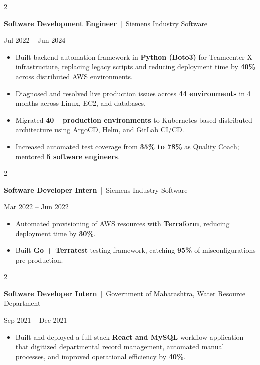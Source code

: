 \documentclass[10pt, letterpaper]{article}
\newenvironment{highlights}{
    \begin{itemize}[
        topsep=0.10 cm,
        parsep=0.06 cm,
        partopsep=0pt,
        itemsep=0.06 cm,
        leftmargin=12pt
    ]
}{
    \end{itemize}
}
\newenvironment{twocolentry}[2][]{
    \onecolentry
    \def\secondColumn{#2}
    \setcolumnwidth{\fill, 4.5 cm}
    \begin{paracol}{2}
}{
    \switchcolumn \raggedleft \secondColumn
    \end{paracol}
    \endonecolentry
}
\begin{document}
\vspace{0.15 cm}

\begin{twocolentry}{Jul 2022 -- Jun 2024}
\textbf{Software Development Engineer} \,|\, Siemens Industry Software
\end{twocolentry}
\begin{highlights}
  \item Built backend automation framework in \textbf{Python (Boto3)} for Teamcenter X infrastructure, replacing legacy scripts and reducing deployment time by \textbf{40\%} across distributed AWS environments.
  \item Diagnosed and resolved live production issues across \textbf{44 environments} in 4 months across Linux, EC2, and databases.
  \item Migrated \textbf{40+ production environments} to Kubernetes-based distributed architecture using ArgoCD, Helm, and GitLab CI/CD.
  \item Increased automated test coverage from \textbf{35\% to 78\%} as Quality Coach; mentored \textbf{5 software engineers}.
\end{highlights}

\vspace{0.15 cm}

\begin{twocolentry}{Mar 2022 -- Jun 2022}
\textbf{Software Developer Intern} \,|\, Siemens Industry Software
\end{twocolentry}
\begin{highlights}
  \item Automated provisioning of AWS resources with \textbf{Terraform}, reducing deployment time by \textbf{30\%}.
  \item Built \textbf{Go + Terratest} testing framework, catching \textbf{95\%} of misconfigurations pre-production.
\end{highlights}

\vspace{0.15 cm}

\begin{twocolentry}{Sep 2021 -- Dec 2021}
\textbf{Software Developer Intern} \,|\, Government of Maharashtra, Water Resource Department
\end{twocolentry}
\begin{highlights}
  \item Built and deployed a full-stack \textbf{React and MySQL} workflow application that digitized departmental record management, automated manual processes, and improved operational efficiency by \textbf{40\%}.
\end{highlights}
\end{document}
